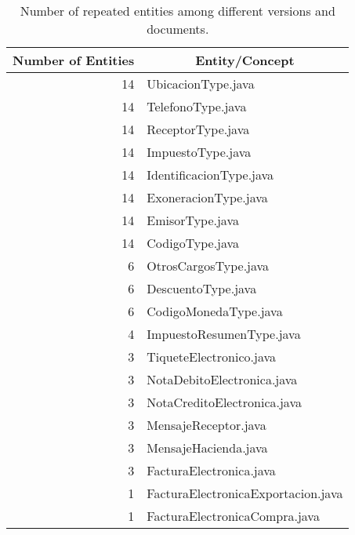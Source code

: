 \documentclass{article}
\begin{document}
\begin{table}[h]
\centering
\begin{tabular}{@{}rl@{}}
\toprule
\textbf{Number of Entities} & \multicolumn{1}{c}{\textbf{Entity/Concept}} \\ \midrule
14                          & UbicacionType.java                   \\
14                          & TelefonoType.java                    \\
14                          & ReceptorType.java                    \\
14                          & ImpuestoType.java                    \\
14                          & IdentificacionType.java              \\
14                          & ExoneracionType.java                 \\
14                          & EmisorType.java                      \\
14                          & CodigoType.java                      \\
6                           & OtrosCargosType.java                 \\
6                           & DescuentoType.java                   \\
6                           & CodigoMonedaType.java                \\
4                           & ImpuestoResumenType.java             \\
3                           & TiqueteElectronico.java              \\
3                           & NotaDebitoElectronica.java           \\
3                           & NotaCreditoElectronica.java          \\
3                           & MensajeReceptor.java                 \\
3                           & MensajeHacienda.java                 \\
3                           & FacturaElectronica.java              \\
1                           & FacturaElectronicaExportacion.java   \\
1                           & FacturaElectronicaCompra.java        \\ \bottomrule
\end{tabular}
\caption{Number of repeated entities among different versions and documents.}
\label{tbl:entities-repeated}
\end{table}
\end{document}
